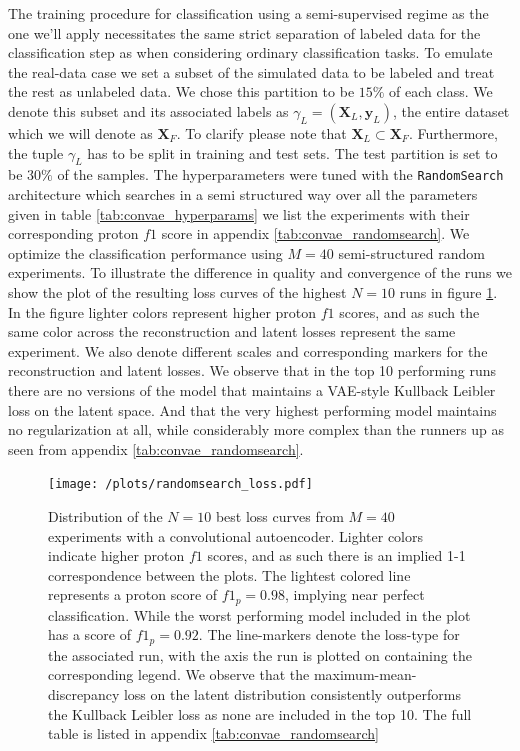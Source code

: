 The training procedure for classification using a semi-supervised regime as the one we'll apply necessitates the same strict separation of labeled data for the classification step as when considering ordinary classification tasks. To emulate the real-data case we set a subset of the simulated data to be labeled and treat the rest as unlabeled data. We chose this partition to be $15\%$ of each class. We denote this subset and its associated labels as $\gamma_L=(\mathbf{X}_L, \mathbf{y}_L)$, the entire dataset which we will denote as $\mathbf{X}_F$. To clarify please note that $\mathbf{X}_L \subset \mathbf{X}_F$. Furthermore, the tuple $\gamma_L$ has to be split in training and test sets. The test partition is set to be $30\%$ of the samples. The hyperparameters were tuned with the \lstinline{RandomSearch} architecture which searches in a semi structured way over all the parameters given in table \ref{tab:convae_hyperparams} we list the experiments with their corresponding proton $f1$ score in appendix \ref{tab:convae_randomsearch}. We optimize the classification performance using $M=40$ semi-structured random experiments. To illustrate the difference in quality and convergence of the runs we show the plot of the resulting loss curves of the highest $N=10$ runs in figure \ref{fig:sim_clf_loss}. In the figure lighter colors represent higher proton $f1$ scores, and as such the same color across the reconstruction and latent losses represent the same experiment. We also denote different scales and corresponding markers for the reconstruction and latent losses. We observe that in the top 10 performing runs there are no versions of the model that maintains a VAE-style Kullback Leibler loss on the latent space. And that the very highest performing model maintains no regularization at all, while considerably more complex than the runners up as seen from appendix \ref{tab:convae_randomsearch}.

\begin{figure}[H]
\centering
\texttt{[image: /plots/randomsearch\_loss.pdf]}
\caption{Distribution of the $N=10$ best loss curves from $M=40$ experiments with a convolutional autoencoder. Lighter colors indicate higher proton $f1$ scores, and as such there is an implied 1-1 correspondence between the plots. The lightest colored line represents a proton score of $f1_p = 0.98$, implying near perfect classification. While the worst performing model included in the plot has a score of $f1_p = 0.92$. The line-markers denote the loss-type for the associated run, with the axis the run is plotted on containing the corresponding legend. We observe that the maximum-mean-discrepancy loss on the latent distribution consistently outperforms the Kullback Leibler loss as none are included in the top 10. The full table is listed in appendix \ref{tab:convae_randomsearch}}\label{fig:sim_clf_loss}
\end{figure}


